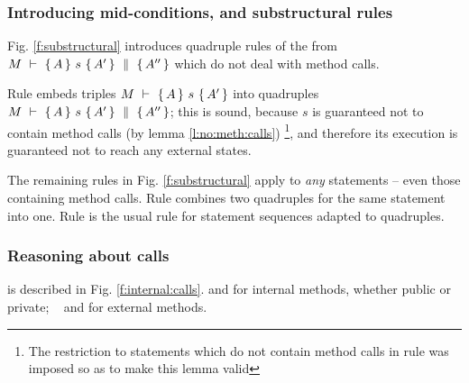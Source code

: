\subsubsection{Introducing mid-conditions, and substructural rules}
Fig. \ref{f:substructural} introduces quadruple rules of the from ${M\ \vdash\ \{\,A\, \} \ s\  \{\,A'\, \}\, \,\parallel\,\, \{\, A'' \, \} }$ which do not deal with method calls.

Rule {} embeds  triples  ${\hproves{M}  {A} {\ s\ }{A'} }$  into quadruples ${M\ \vdash\ \{\,A\, \} \ s\  \{\,A'\, \}\, \,\parallel\,\, \{\, A'' \, \} }$; this is sound, because $s$ is guaranteed not to contain method calls (by lemma \ref{l:no:meth:calls})
\footnote{The restriction to statements which do not contain method calls in rule {} was imposed so as to make this lemma valid}, and therefore its execution is guaranteed not to reach any external states.

 
The remaining rules in Fig. \ref{f:substructural} apply to \emph{any} statements -- even those containing method calls.
Rule {} combines two quadruples for the same statement into one.
Rule   {}is the usual rule  for statement sequences  adapted to quadruples.



\subsubsection{Reasoning about   calls}
\label{s:calls}
is described in Fig. \ref{f:internal:calls}. {}  and {}  for internal methods, whether public or private; \ %
and {} for  external methods.




